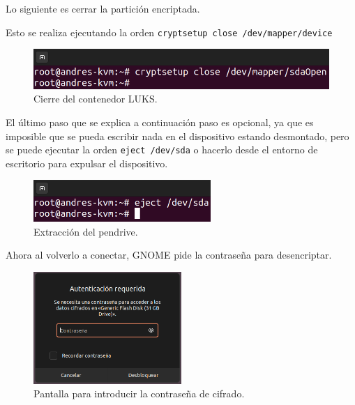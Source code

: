 \documentclass{article}
\begin{document}
\bigskip

Lo siguiente es cerrar la partición encriptada.

Esto se realiza ejecutando la orden \verb|cryptsetup close /dev/mapper/device|


\begin{figure}[H]
    \includegraphics[width=\textwidth]{imagenes/Captura desde 2022-10-30 11-02-02.png}
    \caption{Cierre del contenedor LUKS.}
\end{figure}

\bigskip

El último paso que se explica a continuación paso es opcional, ya que es imposible que se pueda escribir nada en el dispositivo estando desmontado, pero se puede ejecutar la orden \verb|eject /dev/sda| o hacerlo desde el entorno de escritorio para expulsar el dispositivo.

\begin{figure}[H]
    \centering
    \includegraphics[width=0.6\textwidth]{imagenes/Captura desde 2022-10-30 11-03-16.png}
    \caption{Extracción del pendrive.}
\end{figure}

Ahora al volverlo a conectar, GNOME pide la contraseña para desencriptar.

\begin{figure}[H]
    \centering
    \includegraphics[width=0.5\textwidth]{imagenes/Captura desde 2022-10-30 11-04-17.png}
    \caption{Pantalla para introducir la contraseña de cifrado.}
\end{figure}
\end{document}
